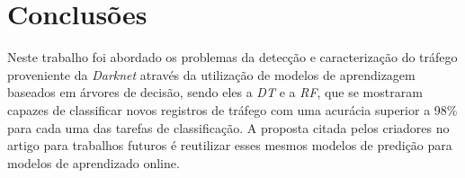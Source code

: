 \section{Conclusões}

Neste trabalho foi abordado os problemas da detecção e caracterização do tráfego proveniente da 
\emph{Darknet} através da utilização de modelos de aprendizagem baseados em árvores de decisão, sendo 
eles a \emph{DT} e a \emph{RF}, que se mostraram capazes de classificar novos registros de tráfego com uma 
acurácia superior a 98\% para cada uma das tarefas de classificação. A proposta citada pelos
criadores no artigo para trabalhos futuros é reutilizar esses mesmos modelos de predição para 
modelos de aprendizado online.